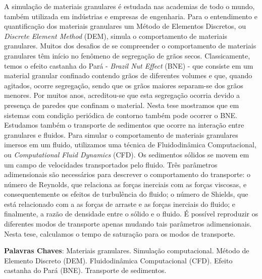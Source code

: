 
\begin{resumo}
    A simulação de materiais granulares é estudada nas academias de todo o mundo, também utilizada em indústrias e empresas de engenharia. Para o entendimento e quantificação dos materiais granulares um Método de Elementos Discretos, ou \textit{Discrete Element Method} (DEM), simula o comportamento de materiais granulares.
    Muitos dos desafios de se compreender o comportamento de materiais granulares têm início no fenômeno de segregação de grãos secos. Classicamente, temos o efeito castanha do Pará - \textit{Brazil Nut Effect} (BNE) - que consiste em um material granular confinado contendo grãos de diferentes volumes e que, quando agitados, ocorre segregação, sendo que os grãos maiores separam-se dos grãos menores. Por muitos anos, acreditou-se que esta segregação ocorria devido a presença de paredes que confinam o material. Nesta tese mostramos que em sistemas com condição periódica de contorno também pode ocorrer o BNE.
    Estudamos também o transporte de sedimentos que ocorre na interação entre granulares e fluidos. Para simular o comportamento de materiais granulares imersos em um fluido, utilizamos uma técnica de Fluidodinâmica Computacional, ou \textit{Computational Fluid Dynamics} (CFD). Os sedimentos sólidos se movem em um campo de velocidades transportados pelo fluido. Três parâmetros adimensionais são necessários para descrever o comportamento do transporte: o número de Reynolds, que relaciona as forças inerciais com as forças viscosas, e consequentemente os efeitos de turbulência do fluido; o número de Shields, que está relacionado com a as forças de arraste e as forças inerciais do fluido; e finalmente, a razão de densidade entre o sólido e o fluido. É possível reproduzir os diferentes modos de transporte apenas mudando tais parâmetros adimensionais. Nesta tese, calculamos o tempo de saturação para os modos de transporte.

    \textbf{Palavras Chaves}: Materiais granulares. Simulação computacional. Método de Elemento Discreto (DEM). Fluidodinâmica Computacional (CFD). Efeito castanha do Pará (BNE). Transporte de sedimentos.



\end{resumo}

